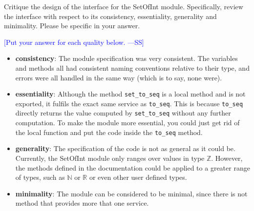 \documentclass[12pt,fleqn]{examtst}
\newcommand{\authornote}[3]{\textcolor{#1}{[#3 ---#2]}}
\newcommand{\authornote}[3]{}
\newcommand{\wss}[1]{\authornote{blue}{SS}{#1}}
\begin{document}
\noindent
\begin{minipage}{\textwidth}

Critique the design of the interface for the SetOfInt module.  Specifically,
review the interface with respect to its consistency, essentiality, generality
and minimality.  Please be specific in your answer.

\wss{Put your answer for each quality below.}

\begin{itemize}
\item \textbf{consistency}: The module specification was very consistent. The variables and methods all had consistent naming conventions relative to their type, and errors were all handled in the same way (which is to say, none were).
\item \textbf{essentiality}:
Although the method \texttt{set\_to\_seq} is a local method and is not exported, it fulfils the exact same service as \texttt{to\_seq}. This is because \texttt{to\_seq} directly returns the value computed by \texttt{set\_to\_seq} without any further computation. To make the module more essential, you could just get rid of the local function and put the code inside the \texttt{to\_seq} method. 
\item \textbf{generality}: 
The specification of the code is not as general as it could be. Currently, the SetOfInt module only ranges over values in type $\mathbb{Z}$. However, the methods defined in the documentation could be applied to a greater range of types, such as $\mathbb{N}$ or $\mathbb{R}$ or even other user defined types. 
\item \textbf{minimality}: The module can be considered to be minimal, since there is not method that provides more that one service. 
\end{itemize}

\end{minipage}


\newpage
\end{document}

